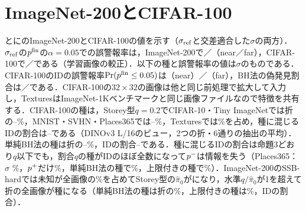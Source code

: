 \section{ImageNet-200とCIFAR-100}
\label{sec:app_in200}
とにのImageNet-200とCIFAR-100の値を示す（$\sigma_{\mathrm{ref}}$と交差適合した$\sigma$の両方）．$\sigma_{\mathrm{ref}}$の$p^{\mathrm{fin}}$の$\alpha{=}0.05$での誤警報率は，ImageNet-200で\NRITNearValFive{}／\NRITFarValFive{}（near／far），CIFAR-100で\NRCFNearValFive{}／\NRCFFarValFive{}である（学習画像の較正）．以下の種と誤警報率の値は$\sigma$のものである．CIFAR-100のIDの誤警報率$\Pr(p^{\mathrm{fin}}\le0.05)$は\NCifarValNearFprZeroZeroFive{}（near）／\NCifarValFarFprZeroZeroFive{}（far），BH法の偽発見割合は\NCifarValNearBhfdp{}／\NCifarValFarBhfdp{}である．CIFAR-100の$32\times32$の画像は他と同じ前処理で拡大して入力し，TexturesはImageNet-1Kベンチマークと同じ画像ファイルなので特徴を共有する．CIFAR-100の種は，Storey型$q{=}0.2$でCIFAR-10・Tiny ImageNetでは折の\NCifarSeedNearStoreyRatioMin{}--\NCifarSeedNearStoreyRatioMax\%，MNIST・SVHN・Places365では\NCifarSeedFarHiStoreyRatioMin{}--\NCifarSeedFarHiStoreyRatioMax\%，Texturesでは\NCifarSeedTextureStoreyRatio\%を占め，種に混じるIDの割合は\NCifarSeedStoreyIdfracMin{}--\NCifarSeedStoreyIdfracMax{}である（DINOv3 L/16のビュー，2つの折・6通りの抽出の平均）．単純BH法の種は折の\NCifarSeedTextureBhRatio{}--\NCifarSeedMnistBhRatio\%，IDの割合\NCifarSeedMnistBhIdfrac{}--\NCifarSeedTinBhIdfrac{}である．種に混じるIDの割合は命題3どおり$q$以下でも，割合$q$の種がIDのほぼ全数になって$p^{-}$は情報を失う（Places365：$\sigma$ \NCifarMainPlacesThreeSixFiveFpr\%，$p^{+}$だけ\NCifarLpPlacesThreeSixFiveFpr\%，単純BH法の種で\NCifarBhPlacesThreeSixFiveFpr\%，上限付きの種で\NCifarStoreycPlacesThreeSixFiveFpr\%）．ImageNet-200のSSB-hardでは未知が全画像の\NInTwoZeroZeroMixSsbHard\%を占めてStorey型の$\hat{\pi}_0$が\NInTwoZeroZeroSeedSsbHardStoreyPiZero{}になり，水準$q/\hat{\pi}_0$が1を超えて折の全画像が種になる（単純BH法の種は折の\NInTwoZeroZeroSeedSsbHardBhRatioPct\%，上限付きの種は\NInTwoZeroZeroSeedSsbHardStoreycRatioPct\%，IDの割合\NInTwoZeroZeroSeedSsbHardStoreycIdfrac{}）．

\begin{table}[htbp]
\centering
\caption{OpenOOD v1.5 CIFAR-100（[\%]，単体，\NCifarNDraws{}通りの抽出の平均）．$\dagger$はOpenOOD v1.5~\cite{zhang2023openood}の報告値（\AUC{}は論文の表2，\FPR{}は同論文の脚注6が指す公開の表）．全学習画像のkNN・クラス平均は本稿と同じ2つの特徴（L2正規化して連結），ゼロショットはCLIP ViT-B/16（）．上限付きの種は$\tau{=}0.05$の$\sigma$（付録\ref{sec:app_cap}）．\textcolor{sotacol}{$\bigstar$}は列の最良値，\colorbox{upd}{青}は本手法以外の全行（報告値，全学習画像・ゼロショットの基線，静的検出器，LGC-max）を上回る値．}
\label{tab:cifar}
\vspace{1.5mm}

\end{table}

